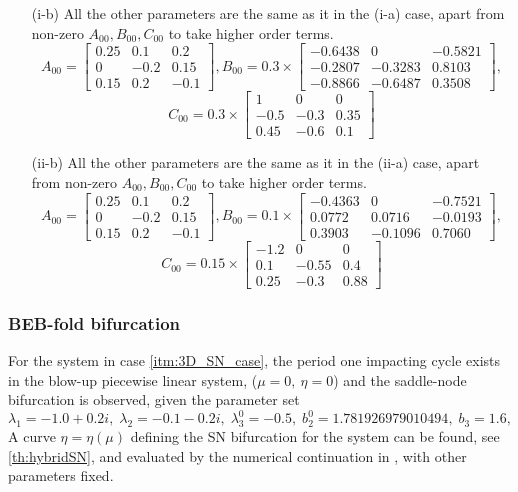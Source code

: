 \begin{enumerate}
	\item[(i-b)] All the other parameters are the same as it in the (i-a) case, apart from non-zero $A_{00}, B_{00}, C_{00}$ to take higher order terms.
	$$
	A_{00} = 
	\begin{bmatrix}
		0.25 & 0.1 & 0.2 \\
		0  & -0.2 & 0.15 \\
		0.15 & 0.2 & -0.1
	\end{bmatrix},
	B_{00} = 0.3 \times
	\begin{bmatrix}
		-0.6438  &  0  & -0.5821\\
		-0.2807 &   -0.3283&  0.8103\\
		-0.8866  & -0.6487 &  0.3508
	\end{bmatrix},
	$$
	$$
	C_{00} = 0.3 \times
	\begin{bmatrix}
		1  &  0     &  0 \\
		-0.5    &  -0.3  &  0.35\\
		0.45    &  -0.6  &  0.1
	\end{bmatrix}
	$$
	\item[(ii-b)]
	All the other parameters are the same as it in the (ii-a) case, apart from non-zero $A_{00}, B_{00}, C_{00}$ to take higher order terms.
	$$
	A_{00} = 
	\begin{bmatrix}
		0.25 & 0.1 & 0.2 \\
		0  & -0.2 & 0.15 \\
		0.15 & 0.2 & -0.1
	\end{bmatrix},
	B_{00} = 0.1 \times
	\begin{bmatrix}
		-0.4363  & 0    &     -0.7521\\
		0.0772  &  0.0716 &   -0.0193\\
		0.3903  & -0.1096 &   0.7060
	\end{bmatrix},
	$$
	$$
	C_{00} = 0.15 \times
	\begin{bmatrix}
		-1.2  &   0    &     0\\
		0.1     &   -0.55   &   0.4\\
		0.25   &    -0.3   &   0.88
	\end{bmatrix}
	$$
\end{enumerate}




\subsubsection{BEB-fold bifurcation}\label{subsec:beb-collides-with-the-sn-bifurcation}
For the system in case \ref{itm:3D_SN_case}, the period one impacting cycle exists in the blow-up piecewise linear
system,
($\mu =0, ~\eta =0$) and the saddle-node bifurcation is observed, given the parameter set
$$
\lambda_1 = -1.0 + 0.2 i, \; \lambda_2 = - 0.1 - 0.2 i, \; \lambda_3^0 = -0.5, \; b_2^0 = 1.781926979010494, \; b_3 =
1.6,
$$
A curve $\eta = \eta(\mu)$ defining the SN bifurcation for the system can be found, see \cref{th:hybridSN}, and
evaluated by the numerical continuation in , with other parameters fixed.
%

